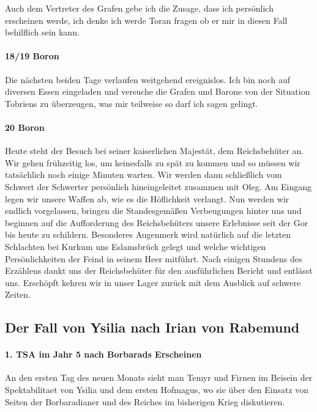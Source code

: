Auch dem Vertreter des Grafen gebe ich die Zusage, dass ich persönlich erscheinen werde, ich denke ich werde Toran fragen ob er mir in diesen Fall behilflich sein kann.

\paragraph{18/19 Boron}
Die nächsten beiden Tage verlaufen weitgehend ereignislos. Ich bin noch auf diversen Essen eingeladen und versuche die Grafen und Barone von der Situation Tobriens zu überzeugen, was mir teilweise so darf ich sagen gelingt.

\paragraph{20 Boron}
Heute steht der Besuch bei seiner kaiserlichen Majestät, dem Reichsbehüter an. Wir gehen frühzeitig los, um keinesfalls zu spät zu kommen und so müssen wir tatsächlich noch einige Minuten warten. Wir werden dann schließlich vom Schwert der Schwerter persönlich hineingeleitet zusammen mit Oleg. Am Eingang legen wir unsere Waffen ab, wie es die Höflichkeit verlangt. Nun werden wir endlich vorgelassen, bringen die Standesgemäßen Verbeugungen hinter uns und beginnen auf die Aufforderung des Reichsbehüters unsere Erlebnisse seit der Gor bis heute zu schildern. Besonderes Augenmerk wird natürlich auf die letzten Schlachten bei Kurkum uns Eslamsbrück gelegt und welche wichtigen Persönlichkeiten der Feind in seinem Heer mitführt. Nach einigen Stundens des Erzählens dankt uns der Reichsbehüter für den ausführlichen Bericht und entlässt uns. Erschöpft kehren wir in unser Lager zurück mit dem Ausblick auf schwere Zeiten.


\subsection{Der Fall von Ysilia nach Irian von Rabemund}

\paragraph{1. TSA im Jahr 5 nach Borbarads Erscheinen}
An den ersten Tag des neuen Monats sieht man Temyr und Firnen im Beisein der Spektabilitaet von Ysilia und dem ersten Hofmagus, wo sie über den Einsatz von Seiten der Borbaradianer und des Reiches im bisherigen Krieg diskutieren.


